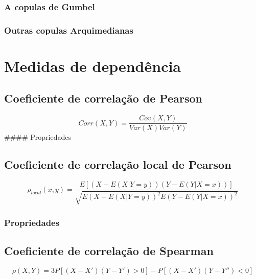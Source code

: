 \documentclass[
	12pt,				%
	oneside,			%
	a4paper,			%
	chapter=TITLE,		%
	section=TITLE,		%
	english,			%
	brazil				%
	]{abntex2}
\begin{document}
\hypertarget{a-copulas-de-gumbel}{%
\subsubsection{A copulas de Gumbel}\label{a-copulas-de-gumbel}}

\hypertarget{outras-copulas-arquimedianas}{%
\subsubsection{Outras copulas Arquimedianas}\label{outras-copulas-arquimedianas}}

\hypertarget{medidas-de-dependuxeancia}{%
\section{Medidas de dependência}\label{medidas-de-dependuxeancia}}

\hypertarget{coeficiente-de-correlauxe7uxe3o-de-pearson}{%
\subsection{Coeficiente de correlação de Pearson}\label{coeficiente-de-correlauxe7uxe3o-de-pearson}}

\[Corr(X, Y ) = \frac{Cov(X, Y )}{Var(X)Var(Y)}\]
\#\#\#\# Propriedades

\hypertarget{coeficiente-de-correlauxe7uxe3o-local-de-pearson}{%
\subsection{Coeficiente de correlação local de Pearson}\label{coeficiente-de-correlauxe7uxe3o-local-de-pearson}}

\[\rho_{local}(x, y) = \frac{E[(X - E(X|Y = y))(Y - E(Y|X = x))]}{\sqrt{E(X - E(X|Y = y))^2 E(Y - E(Y |X = x))^2}}\]

\hypertarget{propriedades}{%
\subsubsection{Propriedades}\label{propriedades}}

\hypertarget{coeficiente-de-correlauxe7uxe3o-de-spearman}{%
\subsection{Coeficiente de correlação de Spearman}\label{coeficiente-de-correlauxe7uxe3o-de-spearman}}

\[\rho(X, Y ) = 3P[(X - X')(Y - Y') > 0] - P[(X - X')(Y - Y'' ) < 0]\]
\end{document}
